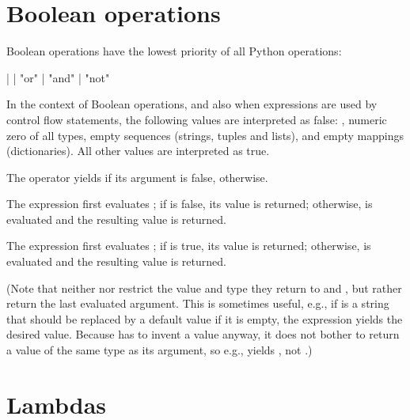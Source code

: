 \section{Boolean operations\label{Booleans}}

Boolean operations have the lowest priority of all Python operations:

\begin{productionlist}
             { | }
             { |  "or" }
             { |  "and" }
             { | "not" }
\end{productionlist}

In the context of Boolean operations, and also when expressions are
used by control flow statements, the following values are interpreted
as false: , numeric zero of all types, empty sequences
(strings, tuples and lists), and empty mappings (dictionaries).  All
other values are interpreted as true.

The operator  yields  if its argument is false,
 otherwise.

The expression  first evaluates ; if
 is false, its value is returned; otherwise,  is
evaluated and the resulting value is returned.

The expression  first evaluates ; if
 is true, its value is returned; otherwise,  is
evaluated and the resulting value is returned.

(Note that neither  nor  restrict the value
and type they return to  and , but rather return the
last evaluated argument.
This is sometimes useful, e.g., if  is a string that should be
replaced by a default value if it is empty, the expression
 yields the desired value.  Because  has to
invent a value anyway, it does not bother to return a value of the
same type as its argument, so e.g.,  yields ,
not .)

\section{Lambdas\label{lambdas}}

